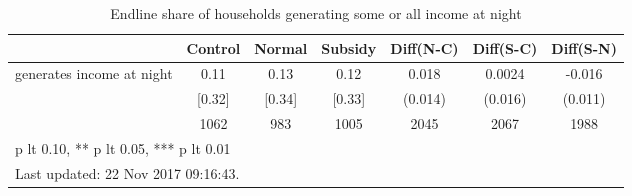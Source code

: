 \begin{table}[htbp]\centering
\def\sym#1{\ifmmode^{#1}\else\(^{#1}\)\fi}
\caption{Endline share of households generating some or all income at night \label{tab:"balance"}}
\begin{tabular*}{1\hsize}{@{\hskip\tabcolsep\extracolsep\fill}l*{1}{cccccc}}
\toprule
                                &  Control&   Normal&  Subsidy&Diff(N-C)         &Diff(S-C)         &Diff(S-N)         \\
\midrule
generates income at night       &     0.11&     0.13&     0.12&    0.018         &   0.0024         &   -0.016         \\
                                &   [0.32]&   [0.34]&   [0.33]&  (0.014)         &  (0.016)         &  (0.011)         \\
                                &     1062&      983&     1005&     2045         &     2067         &     1988         \\
\bottomrule
\multicolumn{7}{l}{\footnotesize * p lt 0.10, ** p lt 0.05, *** p lt 0.01}\\
\multicolumn{7}{l}{\footnotesize Last updated: 22 Nov 2017 09:16:43.}\\
\end{tabular*}
\end{table}
